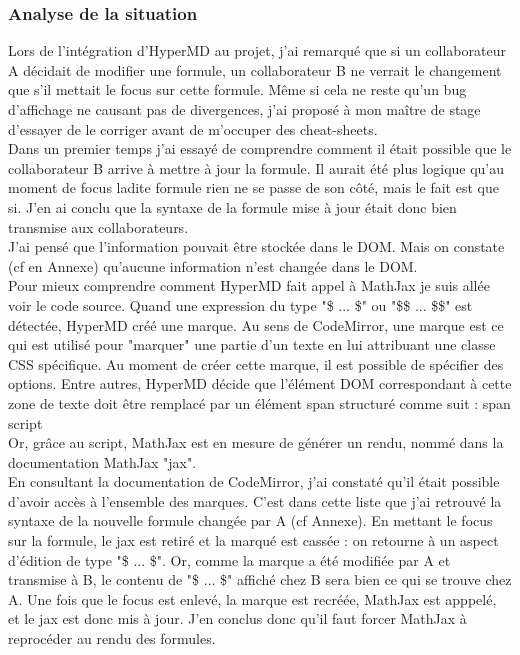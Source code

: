 \documentclass[12pt]{article}
\begin{document}
\subsubsection{Analyse de la situation}
Lors de l'intégration d'HyperMD au projet, j'ai remarqué que si un collaborateur A décidait de modifier une formule, un collaborateur B ne verrait le changement que s'il mettait le focus sur cette formule. Même si cela ne reste qu'un bug d'affichage ne causant pas de divergences, j'ai proposé à mon maître de stage d'essayer de le corriger avant de m'occuper des cheat-sheets.\\
Dans un premier temps j'ai essayé de comprendre comment il était possible que le collaborateur B arrive à mettre à jour la formule. Il aurait été plus logique qu'au moment de focus ladite formule rien ne se passe de son côté, mais le fait est que si. J'en ai conclu que la syntaxe de la formule mise à jour était donc bien transmise aux collaborateurs.\\
J'ai pensé que l'information pouvait être stockée dans le DOM. Mais on constate (cf en Annexe) qu'aucune information n'est changée dans le DOM.\\
Pour mieux comprendre comment HyperMD fait appel à MathJax je suis allée voir le code source. Quand une expression du type "\$ ... \$" ou "\$\$ ... \$\$" est détectée, HyperMD créé une marque. Au sens de CodeMirror, une marque est ce qui est utilisé pour "marquer" une partie d'un texte en lui attribuant une classe CSS spécifique. Au moment de créer cette marque, il est possible de spécifier des options. Entre autres, HyperMD décide que l'élément DOM correspondant à cette zone de texte doit être remplacé par un élément span structuré comme suit :
span
    script\\
Or, grâce au script, MathJax est en mesure de générer un rendu, nommé dans la documentation MathJax "jax".\\
En consultant la documentation de CodeMirror, j'ai constaté qu'il était possible d'avoir accès à l'ensemble des marques. C'est dans cette liste que j'ai retrouvé la syntaxe de la nouvelle formule changée par A (cf Annexe). En mettant le focus sur la formule, le jax est retiré et la marqué est cassée : on retourne à un aspect d'édition de type "\$ ... \$". Or, comme la marque a été modifiée par A et transmise à B, le contenu de "\$ ... \$" affiché chez B sera bien ce qui se trouve chez A. Une fois que le focus est enlevé, la marque est recréée, MathJax est apppelé, et le jax est donc mis à jour. J'en conclus donc qu'il faut forcer MathJax à reprocéder au rendu des formules.\\
\end{document}
